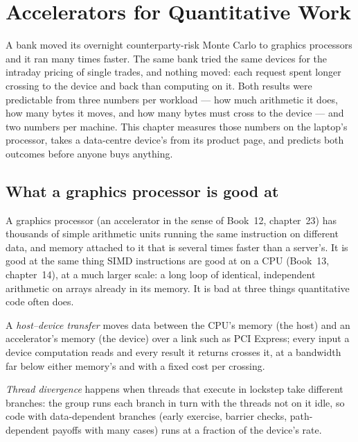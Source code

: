 \chapter{Accelerators for Quantitative Work}\label{ch:pl:accelerators-for-quantitative-work}

A bank moved its overnight counterparty-risk Monte Carlo to graphics processors and it ran many times faster. The same bank tried the
same devices for the intraday pricing of single trades, and nothing moved: each request spent longer crossing to the device and back
than computing on it. Both results were predictable from three numbers per workload --- how much arithmetic it does, how many bytes it
moves, and how many bytes must cross to the device --- and two numbers per machine. This chapter measures those numbers on the laptop's
processor, takes a data-centre device's from its product page, and predicts both outcomes before anyone buys anything.

\section{What a graphics processor is good at}

A graphics processor (an accelerator in the sense of Book~12, chapter~23) has thousands of simple arithmetic units running the same
instruction on different data, and memory attached to it that is several times faster than a server's. It is good at the same thing
SIMD instructions are good at on a CPU (Book~13, chapter~14), at a much larger scale: a long loop of identical, independent arithmetic on
arrays already in its memory. It is bad at three things quantitative code often does.

\begin{definition}\label{def:pl:accelerators-for-quantitative-work:transfer}
A \emph{host--device transfer} moves data between the CPU's memory (the host) and an accelerator's memory
(the device) over a link such as PCI Express; every input a device computation reads and every result it returns crosses it, at a
bandwidth far below either memory's and with a fixed cost per crossing.
\end{definition}

\begin{definition}\label{def:pl:accelerators-for-quantitative-work:divergence}
\emph{Thread divergence} happens when threads that execute in lockstep take different branches: the group runs
each branch in turn with the threads not on it idle, so code with data-dependent branches (early exercise, barrier checks, path-dependent
payoffs with many cases) runs at a fraction of the device's rate.
\end{definition}

